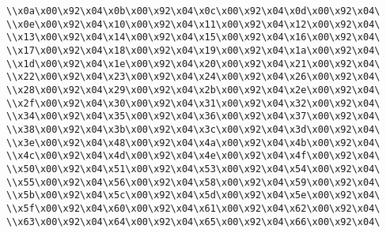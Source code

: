 \verb|\\x0a\x00\x92\x04\x0b\x00\x92\x04\x0c\x00\x92\x04\x0d\x00\x92\x04\|\newline
\verb|\\x0e\x00\x92\x04\x10\x00\x92\x04\x11\x00\x92\x04\x12\x00\x92\x04\|\newline
\verb|\\x13\x00\x92\x04\x14\x00\x92\x04\x15\x00\x92\x04\x16\x00\x92\x04\|\newline
\verb|\\x17\x00\x92\x04\x18\x00\x92\x04\x19\x00\x92\x04\x1a\x00\x92\x04\|\newline
\verb|\\x1d\x00\x92\x04\x1e\x00\x92\x04\x20\x00\x92\x04\x21\x00\x92\x04\|\newline
\verb|\\x22\x00\x92\x04\x23\x00\x92\x04\x24\x00\x92\x04\x26\x00\x92\x04\|\newline
\verb|\\x28\x00\x92\x04\x29\x00\x92\x04\x2b\x00\x92\x04\x2e\x00\x92\x04\|\newline
\verb|\\x2f\x00\x92\x04\x30\x00\x92\x04\x31\x00\x92\x04\x32\x00\x92\x04\|\newline
\verb|\\x34\x00\x92\x04\x35\x00\x92\x04\x36\x00\x92\x04\x37\x00\x92\x04\|\newline
\verb|\\x38\x00\x92\x04\x3b\x00\x92\x04\x3c\x00\x92\x04\x3d\x00\x92\x04\|\newline
\verb|\\x3e\x00\x92\x04\x48\x00\x92\x04\x4a\x00\x92\x04\x4b\x00\x92\x04\|\newline
\verb|\\x4c\x00\x92\x04\x4d\x00\x92\x04\x4e\x00\x92\x04\x4f\x00\x92\x04\|\newline
\verb|\\x50\x00\x92\x04\x51\x00\x92\x04\x53\x00\x92\x04\x54\x00\x92\x04\|\newline
\verb|\\x55\x00\x92\x04\x56\x00\x92\x04\x58\x00\x92\x04\x59\x00\x92\x04\|\newline
\verb|\\x5b\x00\x92\x04\x5c\x00\x92\x04\x5d\x00\x92\x04\x5e\x00\x92\x04\|\newline
\verb|\\x5f\x00\x92\x04\x60\x00\x92\x04\x61\x00\x92\x04\x62\x00\x92\x04\|\newline
\verb|\\x63\x00\x92\x04\x64\x00\x92\x04\x65\x00\x92\x04\x66\x00\x92\x04\|\newline
